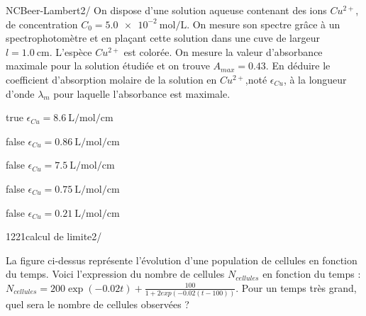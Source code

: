 \documentclass[11pt]{article}
\begin{document}
            \begin{question}{NC}{Beer-Lambert}{2}{/} 
				On dispose d'une solution aqueuse contenant des ions $Cu^{2+}$, de concentration $C_0= \SI{ 5,0e-2}{\mol\per\liter}$. On mesure son spectre grâce à un spectrophotomètre et en plaçant cette solution dans une cuve de largeur $l= \SI{1,0}{\si\centi\meter}$. L'espèce $Cu^{2+}$ est colorée. On mesure la valeur d'absorbance maximale pour la solution étudiée et on trouve $A_{max} = 0.43$. En déduire le coefficient d’absorption molaire de la solution en $Cu^{2+}$,noté $\epsilon_{Cu}$, à la longueur d’onde $\lambda_m$ pour laquelle l’absorbance est maximale.

            \end{question}
%
           \begin{reponses}
            	\item[true] $\epsilon_{Cu} =  \SI{8.6}{\liter\per\mole\per\centi\meter}$
            	\item[false] $\epsilon_{Cu} = \SI{0.86}{\liter\per\mole\per\centi\meter}$
                \item[false] $\epsilon_{Cu} = \SI{7.5}{\liter\per\mole\per\centi\meter}$
                \item[false] $\epsilon_{Cu} = \SI{0.75}{\liter\per\mole\per\centi\meter}$
                \item[false] $\epsilon_{Cu} = \SI{0.21}{\liter\per\mole\per\centi\meter}$
            \end{reponses}
			
			\begin{question}{1221}{calcul de limite}{2}{/}
			\begin{figure}
        		\end{figure}
                La figure ci-dessus représente l'évolution d'une population de cellules en fonction du temps. Voici l'expression du nombre de cellules $N_{cellules}$ en fonction du temps : $N_{cellules}= 200\exp(-0.02t)+\frac{100}{1+2exp(-0.02(t-100))}$. Pour un temps très grand, quel sera le nombre de cellules observées ? 
            \end{question}     
\end{document}
